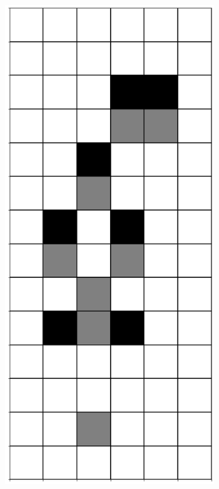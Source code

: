 \documentclass[12pt]{article}
\numberwithin{figure}{section} %
\begin{document}
\begin{figure}[H]
\begin{subfigure}{0.3\textwidth}
     \subcaption{}
   \end{subfigure}
     \begin{subfigure}{0.3\textwidth}
     \centering
     \includegraphics[angle=270,width=\linewidth]{Section4/7.1}

\end{subfigure}
\end{figure}
\end{document}

